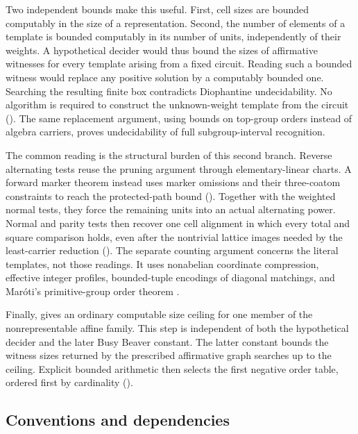 Two independent bounds make this useful.  First, cell sizes are bounded
computably in the size of a representation.  Second, the number of
elements of a template is bounded computably in its number of units,
independently of their weights.  A hypothetical decider would thus bound
the sizes of affirmative witnesses for every template arising from a
fixed circuit.  Reading such a bounded witness would replace any
positive solution by a computably bounded one.  Searching the resulting
finite box contradicts Diophantine undecidability.  No algorithm is
required to construct the unknown-weight template from the circuit
().  The same replacement argument,
using bounds on top-group orders instead of algebra carriers, proves
undecidability of full subgroup-interval recognition.

The common reading is the structural burden of this second branch.
Reverse alternating tests reuse the pruning argument through
elementary-linear charts.  A forward marker theorem instead uses marker
omissions and their three-coatom constraints to reach the protected-path
bound ().  Together
with the weighted normal tests, they force the
remaining units into an actual alternating power.  Normal and parity
tests then recover one cell alignment in which every total and square
comparison holds, even after the nontrivial lattice images needed by the
least-carrier reduction ().  The separate counting
argument concerns the literal templates, not those readings.  It uses
nonabelian coordinate compression, effective integer profiles,
bounded-tuple encodings of diagonal matchings, and Mar\'oti's
primitive-group order theorem \citep[Theorem~1.1]{Maroti2002}.

Finally,  gives an ordinary computable size ceiling
for one member of the nonrepresentable affine family.  This step is
independent of both the hypothetical decider and the later
Busy Beaver constant.  The latter constant bounds the witness sizes
returned by the prescribed affirmative graph searches up to the ceiling.
Explicit bounded arithmetic then
selects the first negative order table, ordered first by cardinality
().



\subsection{Conventions and dependencies}

